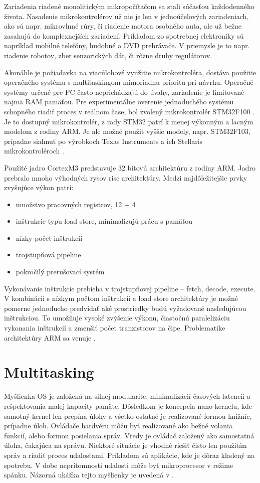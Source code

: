 \documentclass[twoside]{oss-conf}
\begin{document}
Zariadenia riadené monolitickým mikropočítačom sa stali súčasťou každodenného života. Nasadenie mikrokontrolérov už nie je len v jednoúčelových zariadeniach, ako sú napr. mikrovlnné rúry, či riadenie motora osobného auta, ale už bežne zasahujú do komplexnejších zariadení. Príkladom zo spotrebnej elektroniky sú napríklad mobilné telefóny, hudobné a DVD prehrávače. V priemysle je to napr. riadenie robotov, zber senzorických dát, či rôzne druhy regulátorov.

	Akonáhle je požiadavka na viacúlohové využitie mikrokontroléra, dostáva použitie operačného systému s multitaskingom mimoriadnu prioritu pri návrhu. Operačné systémy určené pre PC často neprichádzajú do úvahy, zariadenie je limitované najmä RAM pamäťou. Pre experimentálne overenie jednoduchého systému schopného riadiť proces v reálnom čase, bol zvolený mikrokontrolér STM32F100 \cite{stm32f}. Je to dostupný mikrokontrolér, z rady STM32 patrí k menej výkonným a lacným modelom z rodiny ARM. Je ale možné použiť vyššie modely, napr. STM32F103, prípadne siahnuť po výrobkoch Texas Instruments a ich Stellaris mikrokontroléroch \cite{stellaris}.

	Použité jadro CortexM3 predstavuje 32 bitovú architektúru z rodiny ARM. Jadro prebralo mnoho výhodných rysov risc architektúry. Medzi najdôležitejšie prvky zvyšujúce výkon patrí:
\begin{itemize}
	\item množstvo pracovných registrov, 12 + 4
	\item inštrukcie typu load store, minimalizujú prácu s pamäťou
	\item nízky počet inštrukcií
	\item trojstupňová pipeline
	\item pokročilý prerušovací systém
\end{itemize}
	Vykonávanie inštrukcie prebieha v trojstupňovej pipeline – fetch, decode, execute. V kombinácii s nízkym počtom inštrukcií a load store architektúry je možné pomerne jednoducho predvídať aké prostriedky budú vyžadované nasledujúcou inštrukciou. To umožňuje vysoké zvýšenie výkonu, čiastočnú paralelizáciu vykonania inštrukcií a zmenšiť počet tranzistorov na čipe. Problematike architektúry ARM sa venuje \cite{armarch}.

\section{Multitasking}

Myšlienka OS je založená na silnej modularite, minimalizácií časových latencií a rešpektovania malej kapacity pamäte. Dôsledkom  je koncepcia nano kernelu, kde samotný kernel len prepína úlohy a všetko ostatné je realizované formou knižníc, prípadne úloh. 
	Ovládače hardvéru môžu byť realizované ako bežné volania funkcií, alebo formou posielania správ. Vtedy je ovládač založený ako samostatná úloha, čakajúca na správu. Niektoré situácie je vhodné riešiť čisto len použitím správ a riadiť proces udalosťami. Príkladom sú aplikácie, kde je dôraz kladený na spotrebu. V dobe neprítomnosti udalosti môže byť mikroprocesor v režime spánku. Názorná ukážka tejto myšlienky je uvedená v \cite{eventprog}.
\end{document}
